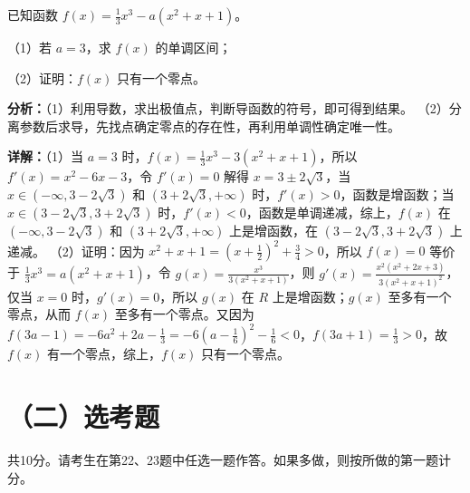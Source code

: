 \begin{question}[points=12]
已知函数 $f(x)=\frac{1}{3}x^3-a(x^2+x+1)$。

（1）若 $a=3$，求 $f(x)$ 的单调区间；

（2）证明：$f(x)$ 只有一个零点。
\begin{solution}

\textbf{分析：}（1）利用导数，求出极值点，判断导函数的符号，即可得到结果。
（2）分离参数后求导，先找点确定零点的存在性，再利用单调性确定唯一性。

\textbf{详解：}（1）当 $a=3$ 时，$f(x)=\frac{1}{3}x^3-3(x^2+x+1)$，所以 $f'(x)=x^2-6x-3$，令 $f'(x)=0$ 解得 $x=3\pm2\sqrt{3}$，当 $x\in(-\infty,3-2\sqrt{3})$ 和 $(3+2\sqrt{3},+\infty)$ 时，$f'(x)>0$，函数是增函数；当 $x\in(3-2\sqrt{3},3+2\sqrt{3})$ 时，$f'(x)<0$，函数是单调递减，综上，$f(x)$ 在 $(-\infty,3-2\sqrt{3})$ 和 $(3+2\sqrt{3},+\infty)$ 上是增函数，在 $(3-2\sqrt{3},3+2\sqrt{3})$ 上递减。
（2）证明：因为 $x^2+x+1=(x+\frac{1}{2})^2+\frac{3}{4}>0$，所以 $f(x)=0$ 等价于 $\frac{1}{3}x^3=a(x^2+x+1)$，令 $g(x)=\frac{x^3}{3(x^2+x+1)}$，则 $g'(x)=\frac{x^2(x^2+2x+3)}{3(x^2+x+1)^2}$，仅当 $x=0$ 时，$g'(x)=0$，所以 $g(x)$ 在 $R$ 上是增函数；$g(x)$ 至多有一个零点，从而 $f(x)$ 至多有一个零点。又因为 $f(3a-1)=-6a^2+2a-\frac{1}{3}=-6(a-\frac{1}{6})^2-\frac{1}{6}<0$，$f(3a+1)=\frac{1}{3}>0$，故 $f(x)$ 有一个零点，综上，$f(x)$ 只有一个零点。
\end{solution}
\end{question}

\section*{（二）选考题}
共10分。请考生在第22、23题中任选一题作答。如果多做，则按所做的第一题计分。

